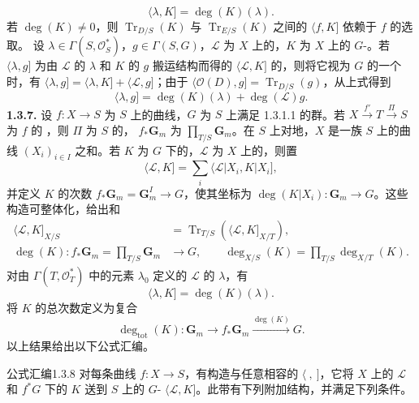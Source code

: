 \[\langle\lambda,K]=\deg(K)(\lambda).\]
若 $\deg(K)\ne0$，则 $\operatorname{Tr}_{D/S}(K)$ 与 $\operatorname{Tr}_{E/S}(K)$ 之间的 $\langle f,K]$ 依赖于 $f$ 的选取。
设 $\lambda\in\Gamma(S,\mathscr O_S^*)$，$g\in\Gamma(S,G)$，$\mathscr L$ 为 $X$ 上的，$K$ 为 $X$ 上的 $G$-。若 $\langle\lambda,g]$ 为由 $\mathscr L$ 的 $\lambda$ 和 $K$ 的 $g$ 搬运结构而得的 $\langle\mathscr L,K]$ 的，则将它视为 $G$ 的一个时，有 $\langle\lambda,g]=\langle\lambda,K]+\langle\mathscr L,g]$；由于 $\langle\mathscr O(D),g]=\operatorname{Tr}_{D/S}(g)$，从上式得到
\begin{equation}\langle\lambda,g]=\deg(K)(\lambda)+\deg(\mathscr L)g.\tag{1.3.6.2}\end{equation}
\textbf{1.3.7.} 设 $f:X\to S$ 为 $S$ 上的曲线，$G$ 为 $S$ 上满足 1.3.1.1 的群。若 $X\xrightarrow{f'}T\xrightarrow\Pi S$ 为 $f$ 的 ，则 $\Pi$ 为 $S$ 的， $f_*\mathbf G_m$ 为 $\prod_{T/S}\mathbf G_m$。在 $S$ 上对地，$X$ 是一族 $S$ 上的曲线 $(X_i)_{i\in I}$ 之和。若 $K$ 为 $G$ 下的，$\mathscr L$ 为 $X$ 上的，则置
\[\langle\mathscr L,K]=\sum_i\langle\mathscr L|X_i,K|X_i],\]
并定义 $K$ 的次数 $f_*\mathbf G_m=\mathbf G_m^I\to G$，使其坐标为 $\deg(K|X_i):\mathbf G_m\to G$。这些构造可整体化，给出和
\begin{align}\langle\mathscr L,K]_{X/S}&=\operatorname{Tr}_{T/S}(\langle\mathscr L,K]_{X/T}),\tag{1.3.7.1}\\\deg(K):f_*\mathbf G_m=\prod_{T/S}\mathbf G_m&\longrightarrow G,\qquad\deg_{X/S}(K)=\prod_{T/S}\deg_{X/T}(K).\tag{1.3.7.2}\end{align}
对由 $\Gamma(T,\mathscr O_T^*)$ 中的元素 $\lambda_0$ 定义的 $\mathscr L$ 的 $\lambda$，有
\begin{equation}\langle\lambda,K]=\deg(K)(\lambda).\tag{1.3.7.3}\end{equation}
将 $K$ 的总次数定义为复合
\[\deg_{\mathrm{tot}}(K):\mathbf G_m\longrightarrow f_*\mathbf G_m\xrightarrow{\deg(K)}G.\]
以上结果给出以下公式汇编。
\begin{SGAresult}{公式汇编}{1.3.8}
对每条曲线 $f:X\to S$，有构造与任意相容的 $\langle\ ,\ ]$，它将 $X$ 上的 $\mathscr L$ 和 $f^*G$ 下的 $K$ 送到 $S$ 上的 $G$- $\langle\mathscr L,K]$。此带有下列附加结构，并满足下列条件。
\end{SGAresult}
